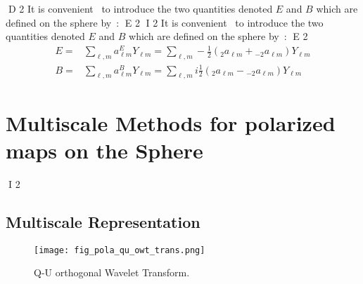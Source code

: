 D 2
It is convenient~\cite{zalda} to introduce the two quantities denoted $E$ and $B$ which are defined on the sphere by~:
E 2
I 2
It is convenient~\citep{zalda} to introduce the two quantities denoted $E$ and $B$ which are defined on the sphere by~:
E 2
\begin{eqnarray}\label{EB}
E = & \sum_{\ell, m} a_{\ell m} ^E Y_{\ell m} = \sum_{\ell, m} - \frac{1}{2} ( {_{ 2}a_{\ell m}} + {_{- 2}a_{\ell m}} ) Y_{\ell m} \\ \nonumber
B = & \sum_{\ell, m} a_{\ell m} ^B Y_{\ell m} = \sum_{\ell, m} i \frac{1}{2} ( {_{ 2}a_{\ell m}} - {_{- 2}a_{\ell m}} ) Y_{\ell m} 
\end{eqnarray}




\chapter{Multiscale Methods for polarized maps on the Sphere}
\label{ch_mms_pola}

I 2
\section{Multiscale Representation}

\begin{figure}[htb]
\texttt{[image: fig\_pola\_qu\_owt\_trans.png]}
\caption{Q-U orthogonal Wavelet Transform.}
\label{fig_qu_owt_trans}
\end{figure}


